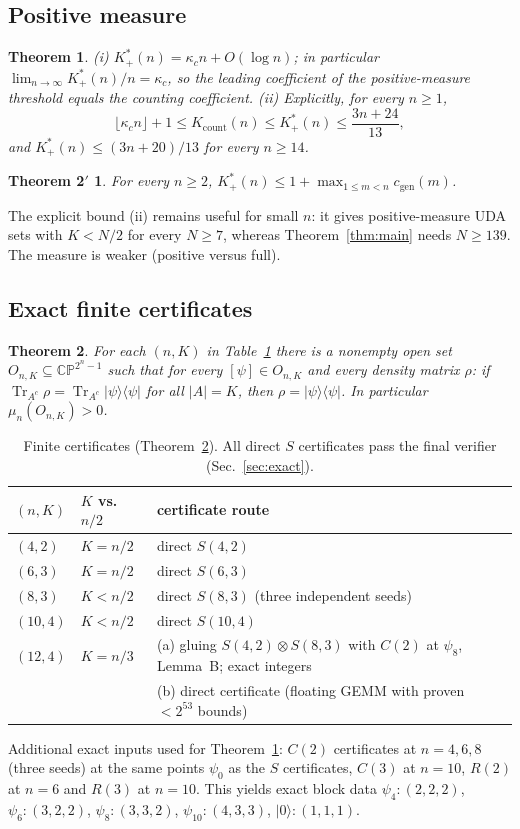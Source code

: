 \documentclass[aps,pra,onecolumn,superscriptaddress,nofootinbib,longbibliography,10pt]{revtex4-2}
\newtheorem{theorem}{Theorem}
\newtheorem*{theorem2p}{Theorem 2$'$}
\theoremstyle{definition}
\newcommand{\CP}{\mathbb{CP}}
\newcommand{\Tr}{\operatorname{Tr}}
\newcommand{\kc}{\kappa_c}
\newcommand{\Kp}{K^{*}_{+}}
\newcommand{\Kc}{K_{\mathrm{count}}}
\newcommand{\cgen}{c_{\mathrm{gen}}}
\begin{document}
\subsection{Positive measure}
\begin{theorem}\label{thm:pos}
(i) $\Kp(n)=\kc n+O(\log n)$; in particular $\lim_{n\to\infty}\Kp(n)/n=\kc$, so the leading coefficient of the positive-measure threshold equals the counting coefficient.
(ii) Explicitly, for every $n\ge1$,
\[
\lfloor\kc n\rfloor+1\le\Kc(n)\le\Kp(n)\le\frac{3n+24}{13},
\]
and $\Kp(n)\le(3n+20)/13$ for every $n\ge14$.
\end{theorem}

\begin{theorem2p}
For every $n\ge2$, $\Kp(n)\le1+\max_{1\le m<n}\cgen(m)$.
\end{theorem2p}

\noindent The explicit bound (ii) remains useful for small $n$: it gives positive-measure UDA sets with $K<N/2$ for every $N\ge7$, whereas Theorem~\ref{thm:main} needs $N\ge139$. The measure is weaker (positive versus full).

\subsection{Exact finite certificates}
\begin{theorem}\label{thm:cert}
For each $(n,K)$ in Table~\ref{tab:cert} there is a nonempty open set $O_{n,K}\subseteq\CP^{2^n-1}$ such that for every $[\psi]\in O_{n,K}$ and every density matrix $\rho$: if $\Tr_{A^c}\rho=\Tr_{A^c}|\psi\rangle\langle\psi|$ for all $|A|=K$, then $\rho=|\psi\rangle\langle\psi|$. In particular $\mu_n(O_{n,K})>0$.
\end{theorem}
\begin{table}[h]
\caption{Finite certificates (Theorem~\ref{thm:cert}). All direct $S$ certificates pass the final verifier (Sec.~\ref{sec:exact}).}\label{tab:cert}
\begin{tabular}{lll}
\toprule
$(n,K)$ & $K$ vs.\ $n/2$ & certificate route\\
\midrule
$(4,2)$ & $K=n/2$ & direct $S(4,2)$\\
$(6,3)$ & $K=n/2$ & direct $S(6,3)$\\
$(8,3)$ & $K<n/2$ & direct $S(8,3)$ (three independent seeds)\\
$(10,4)$ & $K<n/2$ & direct $S(10,4)$\\
$(12,4)$ & $K=n/3$ & (a) gluing $S(4,2)\otimes S(8,3)$ with $C(2)$ at $\psi_8$, Lemma~B; exact integers\\
 & & (b) direct certificate (floating GEMM with proven $<2^{53}$ bounds)\\
\bottomrule
\end{tabular}
\end{table}
\noindent Additional exact inputs used for Theorem~\ref{thm:pos}: $C(2)$ certificates at $n=4,6,8$ (three seeds) at the same points $\psi_0$ as the $S$ certificates, $C(3)$ at $n=10$, $R(2)$ at $n=6$ and $R(3)$ at $n=10$. This yields exact block data $\psi_4:(2,2,2)$, $\psi_6:(3,2,2)$, $\psi_8:(3,3,2)$, $\psi_{10}:(4,3,3)$, $|0\rangle:(1,1,1)$.
\end{document}
